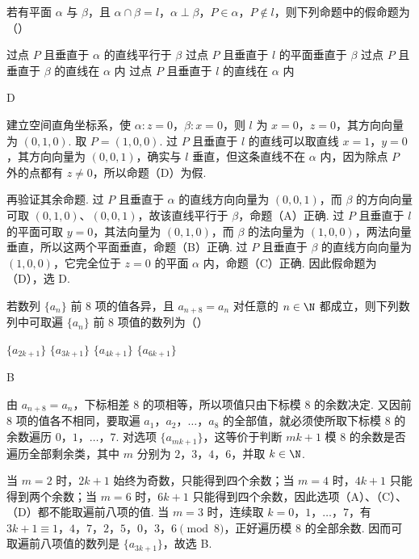 \begin{problem}
若有平面 \(\alpha\) 与 \(\beta\)，且 \(\alpha\cap\beta=l\)，\(\alpha\perp\beta\)，\(P\in\alpha\)，\(P\notin l\)，则下列命题中的假命题为（\quad）

\choices
    {过点 \(P\) 且垂直于 \(\alpha\) 的直线平行于 \(\beta\)}
    {过点 \(P\) 且垂直于 \(l\) 的平面垂直于 \(\beta\)}
    {过点 \(P\) 且垂直于 \(\beta\) 的直线在 \(\alpha\) 内}
    {过点 \(P\) 且垂直于 \(l\) 的直线在 \(\alpha\) 内}
\end{problem}

\begin{answer}
D
\end{answer}

\begin{solution}
建立空间直角坐标系，使 \(\alpha\colon z=0\)，\(\beta\colon x=0\)，则 \(l\) 为 \(x=0\)，\(z=0\)，其方向向量为 \((0,1,0)\). 取 \(P=(1,0,0)\). 过 \(P\) 且垂直于 \(l\) 的直线可以取直线 \(x=1\)，\(y=0\)，其方向向量为 \((0,0,1)\)，确实与 \(l\) 垂直，但这条直线不在 \(\alpha\) 内，因为除点 \(P\) 外的点都有 \(z\ne0\)，所以命题（D）为假.

再验证其余命题. 过 \(P\) 且垂直于 \(\alpha\) 的直线方向向量为 \((0,0,1)\)，而 \(\beta\) 的方向向量可取 \((0,1,0)\)、\((0,0,1)\)，故该直线平行于 \(\beta\)，命题（A）正确. 过 \(P\) 且垂直于 \(l\) 的平面可取 \(y=0\)，其法向量为 \((0,1,0)\)，而 \(\beta\) 的法向量为 \((1,0,0)\)，两法向量垂直，所以这两个平面垂直，命题（B）正确. 过 \(P\) 且垂直于 \(\beta\) 的直线方向向量为 \((1,0,0)\)，它完全位于 \(z=0\) 的平面 \(\alpha\) 内，命题（C）正确. 因此假命题为（D），选 D.
\end{solution}

\begin{problem}
若数列 \(\{a_n\}\) 前 \(8\) 项的值各异，且 \(a_{n+8}=a_n\) 对任意的 \(n\in\N\) 都成立，则下列数列中可取遍 \(\{a_n\}\) 前 \(8\) 项值的数列为（\quad）

\choices
    {\(\{a_{2k+1}\}\)}
    {\(\{a_{3k+1}\}\)}
    {\(\{a_{4k+1}\}\)}
    {\(\{a_{6k+1}\}\)}

\end{problem}

\begin{answer}
B
\end{answer}

\begin{solution}
由 \(a_{n+8}=a_n\)，下标相差 \(8\) 的项相等，所以项值只由下标模 \(8\) 的余数决定. 又因前 \(8\) 项的值各不相同，要取遍 \(a_1\)，\(a_2\)，\(\ldots\)，\(a_8\) 的全部值，就必须使所取下标模 \(8\) 的余数遍历 \(0\)，\(1\)，\(\ldots\)，\(7\). 对选项 \(\{a_{mk+1}\}\)，这等价于判断 \(mk+1\) 模 \(8\) 的余数是否遍历全部剩余类，其中 \(m\) 分别为 \(2\)，\(3\)，\(4\)，\(6\)，并取 \(k\in\N\).

当 \(m=2\) 时，\(2k+1\) 始终为奇数，只能得到四个余数；当 \(m=4\) 时，\(4k+1\) 只能得到两个余数；当 \(m=6\) 时，\(6k+1\) 只能得到四个余数，因此选项（A）、（C）、（D）都不能取遍前八项的值. 当 \(m=3\) 时，连续取 \(k=0\)，\(1\)，\(\ldots\)，\(7\)，有 \(3k+1\equiv1\)，\(4\)，\(7\)，\(2\)，\(5\)，\(0\)，\(3\)，\(6\pmod 8\)，正好遍历模 \(8\) 的全部余数. 因而可取遍前八项值的数列是 \(\{a_{3k+1}\}\)，故选 B.
\end{solution}

